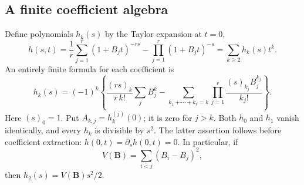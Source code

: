 \subsection{A finite coefficient algebra}
Define polynomials $h_k(s)$ by the Taylor expansion at $t=0$,
\begin{equation}\label{one:h}
 h(s,t)=\frac1r\sum_{j=1}^r(1+B_jt)^{-rs}
                -\prod_{j=1}^r(1+B_jt)^{-s}
       =\sum_{k\ge2}h_k(s)t^k.
\end{equation}
An entirely finite formula for each coefficient is
\begin{equation}\label{one:hk}
 h_k(s)=(-1)^k\left\{
 \frac{(rs)_k}{r\,k!}\sum_jB_j^k
 -\sum_{k_1+\cdots+k_r=k}
                \prod_{j=1}^r\frac{(s)_{k_j}B_j^{k_j}}{k_j!}
                  \right\}.
\end{equation}
Here $(s)_0=1$.  Put $A_{k,j}=h_k^{(j)}(0)$; it is zero for $j>k$.
Both $h_0$ and $h_1$ vanish identically, and every $h_k$ is divisible
by $s^2$.  The latter assertion follows before coefficient extraction:
$h(0,t)=\partial_sh(0,t)=0$.  In particular, if
\begin{equation}\label{one:variance}
 V(\boldsymbol B)=\sum_{i<j}(B_i-B_j)^2,
\end{equation}
then $h_2(s)=V(\boldsymbol B)s^2/2$.


